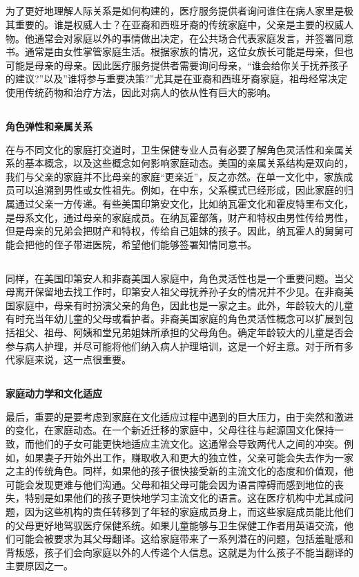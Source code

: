 \documentclass[12pt]{article}
\begin{document}
\begin{spacing}{1.25}
{			\subsection{}
			
			为了更好地理解人际关系是如何构建的，医疗服务提供者询问谁住在病人家里是极其重要的。谁是权威人士？在亚裔和西班牙裔的传统家庭中，父亲是主要的权威人物。他通常会对家庭以外的事情做出决定，在公共场合代表家庭发言，并签署同意书。通常是由女性掌管家庭生活。根据家族的情况，这位女族长可能是母亲，但也可能是母亲的母亲。因此医疗服务提供者需要询问母亲，“谁会给你关于抚养孩子的建议?”以及”谁将参与重要决策?”尤其是在亚裔和西班牙裔家庭，祖母经常决定使用传统药物和治疗方法，因此对病人的依从性有巨大的影响。
			\subsection{}
			\textbf{角色弹性和亲属关系}
			
			在与不同文化的家庭打交道时，卫生保健专业人员有必要了解角色灵活性和亲属关系的基本概念，以及这些概念如何影响家庭动态。美国的亲属关系结构是双向的，我们与父亲的家庭并不比母亲的家庭“更亲近”，反之亦然。在单一文化中，家族成员可以追溯到男性或女性祖先。例如，在中东，父系模式已经形成，因此家庭的归属通过父亲一方传递。有些美国印第安文化，比如纳瓦霍文化和霍皮特里布文化，是母系文化，通过母亲的家庭成员。在纳瓦霍部落，财产和特权由男性传给男性，但是母亲的兄弟会把财产和特权，传给自己姐妹的孩子。因此，纳瓦霍人的舅舅可能会把他的侄子带进医院，希望他们能够签署知情同意书。
			\subsection{}
			同样，在美国印第安人和非裔美国人家庭中，角色灵活性也是一个重要问题。当父母离开保留地去找工作时，印第安人祖父母抚养孙子女的情况并不少见。在非裔美国家庭中，母亲有时扮演父亲的角色，因此也是一家之主。此外，年龄较大的儿童有时充当年幼儿童的父母或看护者。非裔美国家庭的角色灵活性概念可以扩展到包括祖父、祖母、阿姨和堂兄弟姐妹所承担的父母角色。确定年龄较大的儿童是否会参与病人护理，并尽可能将他们纳入病人护理培训，这是一个好主意。对于所有多代家庭来说，这一点很重要。
			\subsection{}
			\textbf{家庭动力学和文化适应}
			
			最后，重要的是要考虑到家庭在文化适应过程中遇到的巨大压力，由于突然和激进的变化，在家庭动态。在一个新近迁移的家庭中，父母往往与起源国文化保持一致，而他们的子女可能更快地适应主流文化。这通常会导致两代人之间的冲突。例如，如果妻子开始外出工作，赚取收入和更大的独立性，父亲可能会失去作为一家之主的传统角色。同样，如果他的孩子很快接受新的主流文化的态度和价值观，他可能会发现更难与他们沟通。父母和祖父母可能会因为语言障碍而感到地位的丧失，特别是如果他们的孩子更快地学习主流文化的语言。这在医疗机构中尤其成问题，因为这些机构的责任转移到了年轻的家庭成员身上，而这些家庭成员能比他们的父母更好地驾驭医疗保健系统。如果儿童能够与卫生保健工作者用英语交流，他们可能会被要求为其父母翻译。这给家庭带来了一系列潜在的问题，包括羞耻感和背叛感，孩子们会向家庭以外的人传递个人信息。这就是为什么孩子不能当翻译的主要原因之一。
}
\end{spacing}
\end{document}
